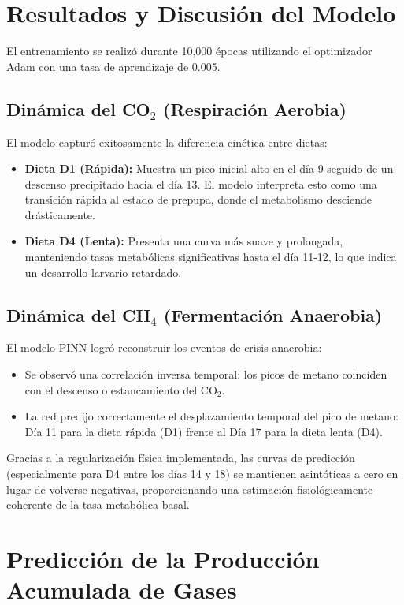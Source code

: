 \section{Resultados y Discusión del Modelo}

El entrenamiento se realizó durante 10,000 épocas utilizando el optimizador Adam con una tasa de aprendizaje de 0.005.

\subsection{Dinámica del CO$_2$ (Respiración Aerobia)}
El modelo capturó exitosamente la diferencia cinética entre dietas:
\begin{itemize}
    \item \textbf{Dieta D1 (Rápida):} Muestra un pico inicial alto en el día 9 seguido de un descenso precipitado hacia el día 13. El modelo interpreta esto como una transición rápida al estado de prepupa, donde el metabolismo desciende drásticamente.
    \item \textbf{Dieta D4 (Lenta):} Presenta una curva más suave y prolongada, manteniendo tasas metabólicas significativas hasta el día 11-12, lo que indica un desarrollo larvario retardado.
\end{itemize}

\subsection{Dinámica del CH$_4$ (Fermentación Anaerobia)}
El modelo PINN logró reconstruir los eventos de crisis anaerobia:
\begin{itemize}
    \item Se observó una correlación inversa temporal: los picos de metano coinciden con el descenso o estancamiento del CO$_2$.
    \item La red predijo correctamente el desplazamiento temporal del pico de metano: Día 11 para la dieta rápida (D1) frente al Día 17 para la dieta lenta (D4).
\end{itemize}

Gracias a la regularización física implementada, las curvas de predicción (especialmente para D4 entre los días 14 y 18) se mantienen asintóticas a cero en lugar de volverse negativas, proporcionando una estimación fisiológicamente coherente de la tasa metabólica basal.

\section{Predicción de la Producción Acumulada de Gases}

